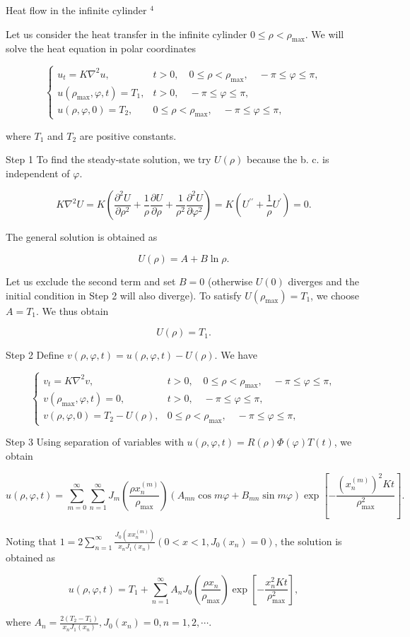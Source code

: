 Heat flow in the infinite cylinder ${ }^4$

Let us consider the heat transfer in the infinite cylinder $0 \leq \rho<\rho_{\max }$. We will solve the heat equation in polar coordinates

$$
\left\{\begin{aligned}
u_t=K \nabla^2 u, & t>0, \quad 0 \leq \rho<\rho_{\max }, \quad-\pi \leq \varphi \leq \pi, \\
u\left(\rho_{\max }, \varphi, t\right)=T_1, & t>0, \quad-\pi \leq \varphi \leq \pi, \\
u(\rho, \varphi, 0)=T_2, & 0 \leq \rho<\rho_{\max }, \quad-\pi \leq \varphi \leq \pi,
\end{aligned}\right.
$$

where $T_1$ and $T_2$ are positive constants.

Step 1
To find the steady-state solution, we try $U(\rho)$ because the b. c. is independent of $\varphi$.

$$
K \nabla^2 U=K\left(\frac{\partial^2 U}{\partial \rho^2}+\frac{1}{\rho} \frac{\partial U}{\partial \rho}+\frac{1}{\rho^2} \frac{\partial^2 U}{\partial \varphi^2}\right)=K\left(U^{\prime \prime}+\frac{1}{\rho} U^{\prime}\right)=0 .
$$


The general solution is obtained as

$$
U(\rho)=A+B \ln \rho .
$$


Let us exclude the second term and set $B=0$ (otherwise $U(0)$ diverges and the initial condition in Step 2 will also diverge). To satisfy $U\left(\rho_{\max }\right)=T_1$, we choose $A=T_1$. We thus obtain

$$
U(\rho)=T_1 .
$$

Step 2
Define $v(\rho, \varphi, t)=u(\rho, \varphi, t)-U(\rho)$. We have

$$
\left\{\begin{aligned}
v_t=K \nabla^2 v, & t>0, \quad 0 \leq \rho<\rho_{\max }, \quad-\pi \leq \varphi \leq \pi, \\
v\left(\rho_{\max }, \varphi, t\right)=0, & t>0, \quad-\pi \leq \varphi \leq \pi, \\
v(\rho, \varphi, 0)=T_2-U(\rho), & 0 \leq \rho<\rho_{\max }, \quad-\pi \leq \varphi \leq \pi,
\end{aligned}\right.
$$


Step 3
Using separation of variables with $u(\rho, \varphi, t)=R(\rho) \Phi(\varphi) T(t)$, we obtain

$$
u(\rho, \varphi, t)=\sum_{m=0}^{\infty} \sum_{n=1}^{\infty} J_m\left(\frac{\rho x_n^{(m)}}{\rho_{\max }}\right)\left(A_{m n} \cos m \varphi+B_{m n} \sin m \varphi\right) \exp \left[-\frac{\left(x_n^{(m)}\right)^2 K t}{\rho_{\max }^2}\right] .
$$


Noting that $1=2 \sum_{n=1}^{\infty} \frac{J_0\left(x x_n^{(m)}\right)}{x_n J_1\left(x_n\right)}\left(0<x<1, J_0\left(x_n\right)=0\right)$, the solution is obtained as

$$
u(\rho, \varphi, t)=T_1+\sum_{n=1}^{\infty} A_n J_0\left(\frac{\rho x_n}{\rho_{\max }}\right) \exp \left[-\frac{x_n^2 K t}{\rho_{\max }^2}\right],
$$

where $A_n=\frac{2\left(T_2-T_1\right)}{x_n J_1\left(x_n\right)}, J_0\left(x_n\right)=0, n=1,2, \cdots$.
